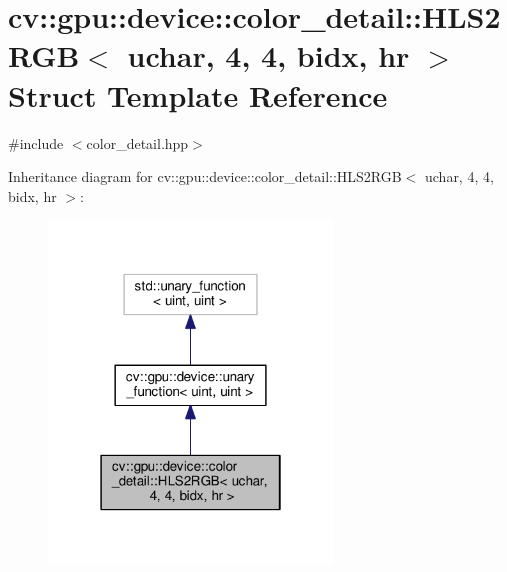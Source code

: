 \hypertarget{structcv_1_1gpu_1_1device_1_1color__detail_1_1HLS2RGB_3_01uchar_00_014_00_014_00_01bidx_00_01hr_01_4}{\section{cv\-:\-:gpu\-:\-:device\-:\-:color\-\_\-detail\-:\-:H\-L\-S2\-R\-G\-B$<$ uchar, 4, 4, bidx, hr $>$ Struct Template Reference}
\label{structcv_1_1gpu_1_1device_1_1color__detail_1_1HLS2RGB_3_01uchar_00_014_00_014_00_01bidx_00_01hr_01_4}
}


{\ttfamily \#include $<$color\-\_\-detail.\-hpp$>$}



Inheritance diagram for cv\-:\-:gpu\-:\-:device\-:\-:color\-\_\-detail\-:\-:H\-L\-S2\-R\-G\-B$<$ uchar, 4, 4, bidx, hr $>$\-:\nopagebreak
\begin{figure}[H]
\begin{center}
\leavevmode
\includegraphics[width=214pt]{structcv_1_1gpu_1_1device_1_1color__detail_1_1HLS2RGB_3_01uchar_00_014_00_014_00_01bidx_00_01hr_01_4__inherit__graph}
\end{center}
\end{figure}


